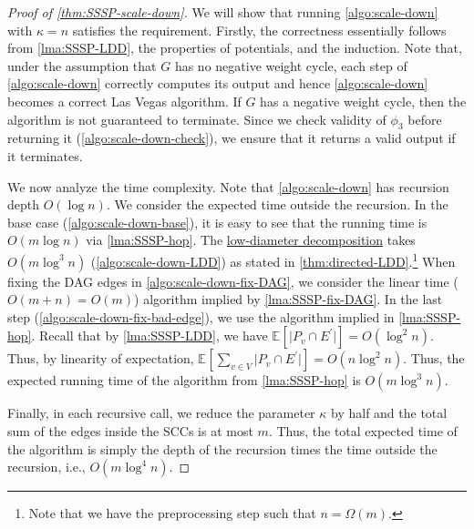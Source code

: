 \begin{proof}[Proof of \autoref{thm:SSSP-scale-down}]
	We will show that running \autoref{algo:scale-down} with \(\kappa = n\) satisfies the requirement. Firstly, the correctness essentially follows from \autoref{lma:SSSP-LDD}, the properties of potentials, and the induction. Note that, under the assumption that \(G\) has no negative weight cycle, each step of \autoref{algo:scale-down} correctly computes its output and hence \autoref{algo:scale-down} becomes a correct Las Vegas algorithm. If \(G\) has a negative weight cycle, then the algorithm is not guaranteed to terminate. Since we check validity of \(\phi _3 \) before returning it (\autoref{algo:scale-down-check}), we ensure that it returns a valid output if it terminates.

	We now analyze the time complexity. Note that \autoref{algo:scale-down} has recursion depth \(O(\log n)\). We consider the expected time outside the recursion. In the base case (\autoref{algo:scale-down-base}), it is easy to see that the running time is \(O(m \log n)\) via \autoref{lma:SSSP-hop}. The \hyperref[thm:directed-LDD]{low-diameter decomposition} takes \(O(m \log ^3 n)\) (\autoref{algo:scale-down-LDD}) as stated in \autoref{thm:directed-LDD}.\footnote{Note that we have the preprocessing step such that \(n = \Omega (m)\).} When fixing the DAG edges in \autoref{algo:scale-down-fix-DAG}, we consider the linear time (\(O(m + n) = O(m)\)) algorithm implied by \autoref{lma:SSSP-fix-DAG}. In the last step (\autoref{algo:scale-down-fix-bad-edge}), we use the algorithm implied in \autoref{lma:SSSP-hop}. Recall that by \autoref{lma:SSSP-LDD}, we have \(\mathbb{E}_{}[\lvert P_v \cap E^{\prime} \rvert ] = O(\log ^2 n)\). Thus, by linearity of expectation, \(\mathbb{E}_{}[\sum_{v \in V} \lvert P_v \cap E^{\prime} \rvert ] = O(n \log ^2 n)\). Thus, the expected running time of the algorithm from \autoref{lma:SSSP-hop} is \(O(m \log ^3 n)\).

	Finally, in each recursive call, we reduce the parameter \(\kappa \) by half and the total sum of the edges inside the SCCs is at most \(m\). Thus, the total expected time of the algorithm is simply the depth of the recursion times the time outside the recursion, i.e., \(O(m \log ^4 n)\).
\end{proof}

